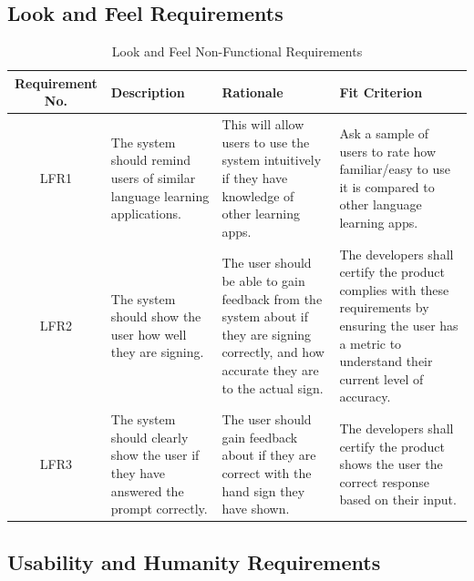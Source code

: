 \documentclass[12pt, titlepage]{article}
\begin{document}
\subsection{Look and Feel Requirements}

\begin{table}[H]
\caption{Look and Feel Non-Functional Requirements}
\noindent \begin{tabular}{| c | p{3cm}| p{3cm}| p{3cm}|}
\hline 
\textbf{Requirement No.} & \textbf{Description} & \textbf{Rationale} & \textbf{Fit Criterion}\\
\hline
LFR1 & The system should remind users of similar language learning applications. & This will allow users to use the system intuitively if they have knowledge of other learning apps. & Ask a sample of users to rate how familiar/easy to use it is compared to other language learning apps. \\
\hline
LFR2 & The system should show the user how well they are signing. & The user should be able to gain feedback from the system about if they are signing correctly, and how accurate they are to the actual sign. & The developers shall certify the product complies with these requirements by ensuring the user has a metric to understand their current level of accuracy. \\
\hline
LFR3 & The system should clearly show the user if they have answered the prompt correctly. & The user should gain feedback about if they are correct with the hand sign they have shown. & The developers shall certify the product shows the user the correct response based on their input. \\
\bottomrule
\end{tabular}
\end{table}

\subsection{Usability and Humanity Requirements}
\end{document}
